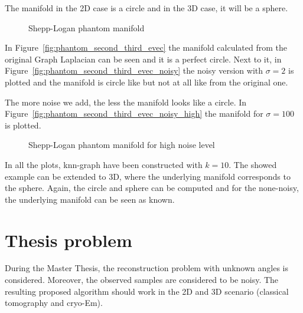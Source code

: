 The manifold in the 2D case is a circle and in the 3D case, it will be a sphere.

\begin{figure}[H]
    \centering
    \caption{Shepp-Logan phantom manifold}
\end{figure}

In Figure~\ref{fig:phantom_second_third_evec} the manifold calculated from the original Graph Laplacian
can be seen and it is a perfect circle. Next to it, in Figure~\ref{fig:phantom_second_third_evec_noisy}
the noisy version with $\sigma=2$ is plotted and the manifold is circle like but not at all like from the original one.

The more noise we add, the less the manifold looks like a circle. In Figure~\ref{fig:phantom_second_third_evec_noisy_high}
the manifold for $\sigma=100$ is plotted.

\begin{figure}[H]
    \centering
    \caption{Shepp-Logan phantom manifold for high noise level}
\end{figure}

In all the plots, knn-graph have been constructed with $k=10$. The showed example can be extended to 3D, where the underlying manifold corresponds to the sphere.
Again, the circle and sphere can be computed and for the none-noisy, the underlying manifold can be seen as known.


\section{Thesis problem}
During the Master Thesis, the reconstruction problem with unknown angles is considered. 
Moreover, the observed samples are considered to be noisy. 
The resulting proposed algorithm should work in the 2D and 3D scenario (classical tomography and cryo-Em).


